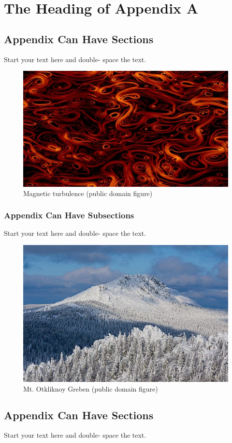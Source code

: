 \documentclass[debug, font=Times]{gw-dissertation}[2021/11/19]
\begin{document}
\sloppy
\printbibliography
\fussy

\appendix
\chapter{The Heading of Appendix A}

    \section{Appendix Can Have Sections}
    Start your text here and double- space the text.
    \begin{figure}[h!]
        \Centering
        \includegraphics[width=0.5\linewidth]{magnetic_turbulence.jpg}
        \caption{Magnetic turbulence (public domain figure)}
    \end{figure}

        \subsection{Appendix Can Have Subsections}
        Start your text here and double- space the text.
        \begin{figure}[h!]
            \Centering
            \includegraphics[width=0.5\linewidth]{mt_otkliknoy_greben.jpg}
            \caption{Mt. Otkliknoy Greben (public domain figure)}
        \end{figure}

    \section{Appendix Can Have Sections}
    Start your text here and double- space the text.
\end{document}
